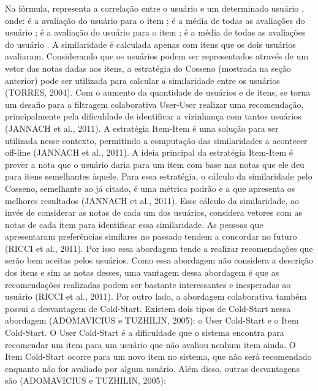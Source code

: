 Na fórmula,  representa a correlação entre o usuário  e um determinado usuário , onde:  é a avaliação do usuário  para o item ;  é a média de todas as avaliações do usuário ;  é a avaliação do usuário  para o item ;  é a média de todas as avaliações do usuário . A similaridade é calculada apenas com itens que os dois usuários avaliaram.
Considerando que os usuários podem ser representados através de um vetor das notas dadas aos itens, a estratégia do Cosseno (mostrada na seção anterior) pode ser utilizada para calcular a similaridade entre os usuários (TORRES, 2004).
Com o aumento da quantidade de usuários e de itens, se torna um desafio para a filtragem colaborativa User-User realizar uma recomendação, principalmente pela dificuldade de identificar a vizinhança com tantos usuários (JANNACH et al., 2011). A estratégia Item-Item é uma solução para ser utilizada nesse contexto, permitindo a computação das similaridades a acontecer off-line (JANNACH et al., 2011). A ideia principal da estratégia Item-Item é prever a nota que o usuário daria para um item com base nas notas que ele deu para itens semelhantes àquele. Para essa estratégia, o cálculo da similaridade pelo Cosseno, semelhante ao já citado, é uma métrica padrão e a que apresenta os melhores resultados (JANNACH et al., 2011). Esse cálculo da similaridade, ao invés de considerar as notas de cada um dos usuários, considera vetores com as notas de cada item para identificar essa similaridade.
As pessoas que apresentaram preferências similares no passado tendem a concordar no futuro (RICCI et al., 2011). Por isso essa abordagem tende a realizar recomendações que serão bem aceitas pelos usuários.
Como essa abordagem não considera a descrição dos itens e sim as notas desses, uma vantagem dessa abordagem é que as recomendações realizadas podem ser bastante interessantes e inesperadas ao usuário (RICCI et al., 2011).
Por outro lado, a abordagem colaborativa também possui a desvantagem de Cold-Start. Existem dois tipos de Cold-Start nessa abordagem (ADOMAVICIUS e TUZHILIN, 2005): o User Cold-Start e o Item Cold-Start. O User Cold-Start é a dificuldade que o sistema encontra para recomendar um item para um usuário que não avaliou nenhum item ainda. O Item Cold-Start ocorre para um novo item no sistema, que não será recomendado enquanto não for avaliado por algum usuário.
Além disso, outras desvantagens são (ADOMAVICIUS e TUZHILIN, 2005):

